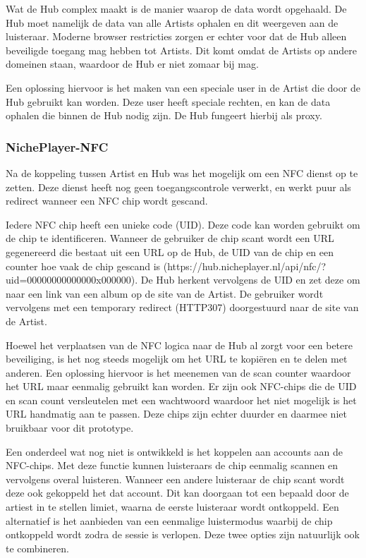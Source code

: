 Wat de Hub complex maakt is de manier waarop de data wordt opgehaald. De Hub moet namelijk de data van alle Artists ophalen en dit weergeven aan de luisteraar. Moderne browser restricties zorgen er echter voor dat de Hub alleen beveiligde toegang mag hebben tot Artists. Dit komt omdat de Artists op andere domeinen staan, waardoor de Hub er niet zomaar bij mag.

Een oplossing hiervoor is het maken van een speciale user in de Artist die door de Hub gebruikt kan worden. Deze user heeft speciale rechten, en kan de data ophalen die binnen de Hub nodig zijn. De Hub fungeert hierbij als proxy.

\subsubsection*{NichePlayer-NFC}
Na de koppeling tussen Artist en Hub was het mogelijk om een NFC dienst op te zetten. Deze dienst heeft nog geen toegangscontrole verwerkt, en werkt puur als redirect wanneer een NFC chip wordt gescand.

Iedere NFC chip heeft een unieke code (UID). Deze code kan worden gebruikt om de chip te identificeren. Wanneer de gebruiker de chip scant wordt een URL gegenereerd die bestaat uit een URL op de Hub, de UID van de chip en een counter hoe vaak de chip gescand is (https://hub.nicheplayer.nl/api/nfc/?uid=00000000000000x000000). De Hub herkent vervolgens de UID en zet deze om naar een link van een album op de site van de Artist. De gebruiker wordt vervolgens met een temporary redirect (HTTP307) doorgestuurd naar de site van de Artist.

Hoewel het verplaatsen van de NFC logica naar de Hub al zorgt voor een betere beveiliging, is het nog steeds mogelijk om het URL te kopiëren en te delen met anderen. Een oplossing hiervoor is het meenemen van de scan counter waardoor het URL maar eenmalig gebruikt kan worden. Er zijn ook NFC-chips die de UID en scan count versleutelen met een wachtwoord waardoor het niet mogelijk is het URL handmatig aan te passen. Deze chips zijn echter duurder en daarmee niet bruikbaar voor dit prototype.

Een onderdeel wat nog niet is ontwikkeld is het koppelen aan accounts aan de NFC-chips. Met deze functie kunnen luisteraars de chip eenmalig scannen en vervolgens overal luisteren. Wanneer een andere luisteraar de chip scant wordt deze ook gekoppeld het dat account. Dit kan doorgaan tot een bepaald door de artiest in te stellen limiet, waarna de eerste luisteraar wordt ontkoppeld. Een alternatief is het aanbieden van een eenmalige luistermodus waarbij de chip ontkoppeld wordt zodra de sessie is verlopen. Deze twee opties zijn natuurlijk ook te combineren.

